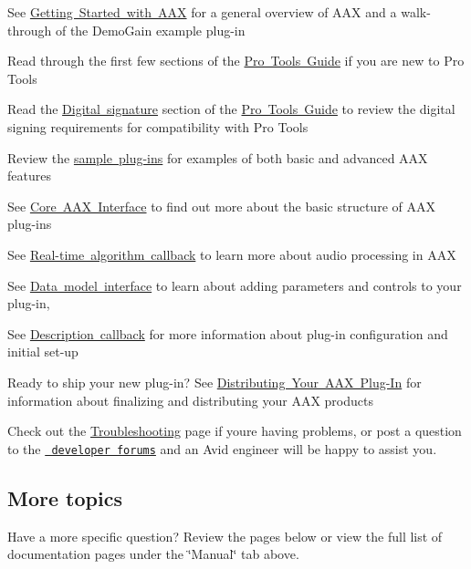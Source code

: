 \begin{DoxyItemize}
\item See \mbox{\hyperlink{a00794}{Getting Started with A\+AX}} for a general overview of A\+AX and a walk-\/through of the Demo\+Gain example plug-\/in \item Read through the first few sections of the \mbox{\hyperlink{a00830}{Pro Tools Guide}} if you are new to Pro Tools \item Read the \mbox{\hyperlink{a00830_subsection__digital_signature_}{Digital signature}} section of the \mbox{\hyperlink{a00830}{Pro Tools Guide}} to review the digital signing requirements for compatibility with Pro Tools \item Review the \mbox{\hyperlink{a00848}{sample plug-\/ins}} for examples of both basic and advanced A\+AX features \item See \mbox{\hyperlink{a00795}{Core A\+AX Interface}} to find out more about the basic structure of A\+AX plug-\/ins \item See \mbox{\hyperlink{a00797}{Real-\/time algorithm callback}} to learn more about audio processing in A\+AX \item See \mbox{\hyperlink{a00798}{Data model interface}} to learn about adding parameters and controls to your plug-\/in, \item See \mbox{\hyperlink{a00796}{Description callback}} for more information about plug-\/in configuration and initial set-\/up \item Ready to ship your new plug-\/in? See \mbox{\hyperlink{a00843}{Distributing Your A\+AX Plug-\/\+In}} for information about finalizing and distributing your A\+AX products \item Check out the \mbox{\hyperlink{a00842}{Troubleshooting}} page if you\textquotesingle{}re having problems, or post a question to the \href{https://dev.avid.com}{\texttt{ developer forums}} and an Avid engineer will be happy to assist you.\end{DoxyItemize}
\hypertarget{a00793_welcome_more}{}\subsection{More topics}\label{a00793_welcome_more}
Have a more specific question? Review the pages below or view the full list of documentation pages under the \char`\"{}\+Manual\char`\"{} tab above.

